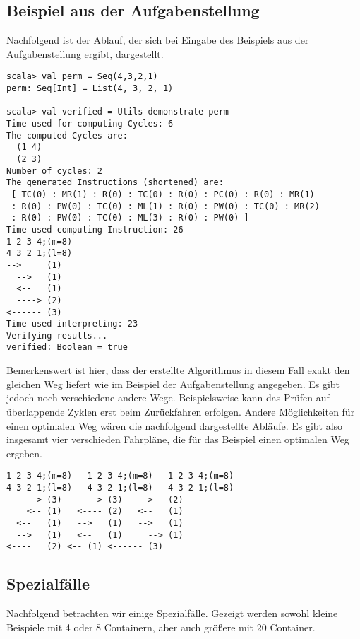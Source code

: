 \subsection{Beispiel aus der Aufgabenstellung}
Nachfolgend ist der Ablauf, der sich bei Eingabe des Beispiels aus der Aufgabenstellung ergibt, dargestellt.
\begin{lstlisting}
scala> val perm = Seq(4,3,2,1)               
perm: Seq[Int] = List(4, 3, 2, 1)

scala> val verified = Utils demonstrate perm 
Time used for computing Cycles: 6
The computed Cycles are: 
  (1 4)
  (2 3)
Number of cycles: 2
The generated Instructions (shortened) are: 
 [ TC(0) : MR(1) : R(0) : TC(0) : R(0) : PC(0) : R(0) : MR(1)
 : R(0) : PW(0) : TC(0) : ML(1) : R(0) : PW(0) : TC(0) : MR(2)
 : R(0) : PW(0) : TC(0) : ML(3) : R(0) : PW(0) ] 
Time used computing Instruction: 26
1 2 3 4;(m=8)
4 3 2 1;(l=8)
-->     (1)
  -->   (1)
  <--   (1)
  ----> (2)
<------ (3)
Time used interpreting: 23
Verifying results...
verified: Boolean = true
\end{lstlisting}
 Bemerkenswert ist hier, dass der erstellte Algorithmus in diesem Fall exakt den gleichen Weg liefert wie im Beispiel der Aufgabenstellung angegeben.
 Es gibt jedoch noch verschiedene andere Wege.
 Beispielsweise kann das Prüfen auf überlappende Zyklen erst beim Zurückfahren erfolgen.
 Andere Möglichkeiten für einen optimalen Weg wären die nachfolgend dargestellte Abläufe.
 Es gibt also insgesamt vier verschieden Fahrpläne, die für das Beispiel einen optimalen Weg ergeben.
\begin{lstlisting}                   
1 2 3 4;(m=8)	1 2 3 4;(m=8)	1 2 3 4;(m=8)
4 3 2 1;(l=8)	4 3 2 1;(l=8)	4 3 2 1;(l=8)
------>	(3)	------>	(3)	---->	(2)
    <--	(1)	  <----	(2)	  <--	(1)
  <--	(1)	  -->	(1)	  -->	(1)
  -->	(1)	  <--	(1)	    -->	(1)
<----	(2)	<--	(1)	<------	(3)
\end{lstlisting}
\clearpage
\subsection{Spezialfälle}
Nachfolgend betrachten wir einige Spezialfälle. Gezeigt werden sowohl kleine Beispiele mit 4 oder 8 Containern, aber auch größere mit 20 Container.
